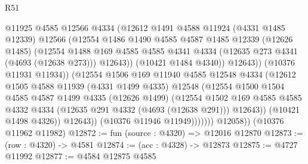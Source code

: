 \begin{lexlean}{R51}
\begin{coremodule}
                            @11925
                            @4585
                            @12566
                            @4334
                            (@12612
                              @1491
                              @4588
                              @11924
                              (@4331 @1485 @12339)
                              @12566
                              (@12554
                                @1486
                                @1490
                                @4585
                                @4587
                                @1485
                                @12339
                                (@12626 @1485)
                                (@12554
                                  @1488
                                  @169
                                  @4585
                                  @4585
                                  @4341
                                  @4334
                                  (@12635 @273 @4341 (@4693 (@12638 @273)))
                                  @12643))
                              (@10421 @1484 @4340))
                            @12643))
                        (@10376 @11931 @11934))
                      (@12554
                        @1506
                        @169
                        @11940
                        @4585
                        @12548
                        @4334
                        (@12612
                          @1505
                          @4588
                          @11939
                          (@4331 @1499 @4335)
                          @12548
                          (@12554
                            @1500
                            @1504
                            @4585
                            @4587
                            @1499
                            @4335
                            (@12626 @1499)
                            (@12554
                              @1502
                              @169
                              @4585
                              @4585
                              @4332
                              @4334
                              (@12635 @291 @4332 (@4693 (@12638 @291)))
                              @12643))
                          (@10421 @1498 @4326))
                        @12643))
                    (@10376 @11946 @11949)))))))
        @12058))
    (@10376 @11962 @11982)
@12872 := fun (source : @4320) => @12016 @12870
@12873 := (row : @4320) -> @4581
@12874 := (acc : @4328) -> @12873
@12875 := @4727 @11992
@12877 := @4584 @12875 @4585

\end{coremodule}
\end{lexlean}
